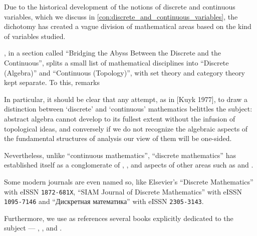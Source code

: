 \begin{remark}\label{rem:discrete_mathematics}
  Due to the historical development of the notions of discrete and continuous variables, which we discuss in \cref{con:discrete_and_continuous_variables}, the dichotomy has created a vague division of mathematical areas based on the kind of variables studied.

  \textcite[\S III.6]{Kuyk1977ComplementarityInMathematics}, in a section called \enquote{Bridging the Abyss Between the Discrete and the Continuous}, splits a small list of mathematical disciplines into \enquote{Discrete (Algebra)} and \enquote{Continuous (Topology)}, with set theory and category theory kept separate. To this, \textcite[xx]{Johnstone1982StoneSpaces} remarks
  \begin{displayquote}
    In particular, it should be clear that any attempt, as in [Kuyk 1977], to draw a distinction between \enquote*{discrete} and \enquote*{continuous} mathematics belittles the subject: abstract algebra cannot develop to its fullest extent without the infusion of topological ideas, and conversely if we do not recognize the algebraic aspects of the fundamental structures of analysis our view of them will be one-sided.
  \end{displayquote}

  Nevertheless, unlike \enquote{continuous mathematics}, \enquote{discrete mathematics} has established itself as a conglomerate of , ,  and aspects of other areas such as  and .

  Some modern journals are even named so, like Elsevier's \enquote{Discrete Mathematics} with eISSN \texttt{1872-681X}, \enquote{SIAM Journal of Discrete Mathematics} with eISSN \texttt{1095-7146} and \enquote{Дискретная математика} with eISSN \texttt{2305-3143}.

  Furthermore, we use as references several books explicitly dedicated to the subject --- \cite{Rosen2019DiscreteMathematics}, \cite{БелоусовТкачёв2004ДискретнаяМатематика}, \cite{Новиков2013ДискретнаяМатематика} and \cite{Яблонский2003ДискретнаяМатематика}.
\end{remark}

